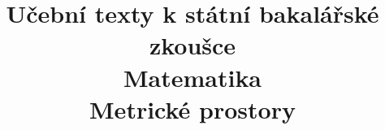 \clearpage

\clearpage

\title{\LARGE Učební texty k státní bakalářské zkoušce \\ Matematika \\ Metrické prostory}



\maketitle

\newpage
\setcounter{section}{5}



